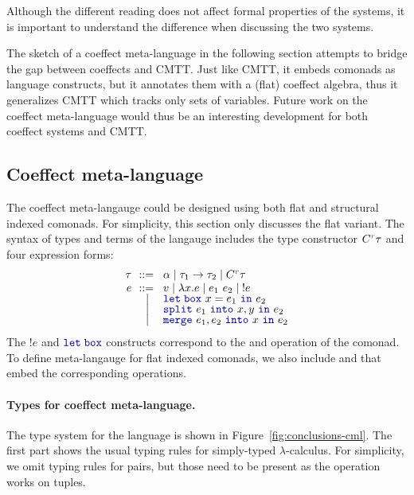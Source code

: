 \noindent
Although the different reading does not affect formal properties of the systems, it is important
to understand the difference when discussing the two systems. 

The sketch of a coeffect meta-language in the following section attempts to bridge the gap
between coeffects and CMTT. Just like CMTT, it embeds comonads as language constructs, but
it annotates them with a (flat) coeffect algebra, thus it generalizes CMTT which tracks only
sets of variables. Future work on the coeffect meta-language would thus be an interesting 
development for both coeffect systems and CMTT.


\subsection{Coeffect meta-language}

The coeffect meta-langauge could be designed using both flat and structural indexed comonads.
For simplicity, this section only discusses the flat variant. The syntax of types and terms
of the langauge includes the type constructor $\ctyp{\cclrd{r}}{\tau}$ and four expression forms:
%
\begin{equation*}
\begin{array}{rcl}
 \tau &\narrow{::=}& \alpha \sep \tau_1 \rightarrow \tau_2 \sep \ctyp{\cclrd{r}}{\tau}\\
 e &\narrow{::=}& v \sep \lambda x.e \sep e_1~e_2 \sep !e    \\[-0.25em]
  &        \sep& \kvd{let\;box}~x=e_1~\kvd{in}~e_2           \\[-0.25em]
  &        \sep& \kvd{split}~e_1~\kvd{into}~x,y~\kvd{in}~e_2 \\[-0.25em]
  &        \sep& \kvd{merge}~e_1, e_2~\kvd{into}~x~\kvd{in}~e_2 
\end{array}
\end{equation*}
%
The $!e$ and $\kvd{let\;box}$ constructs correspond to the  and 
operation of the comonad. To define meta-langauge for flat indexed comonads, we also include 
 and  that embed the corresponding operations. 

\paragraph{Types for coeffect meta-language.}
The type system for the language is shown in Figure~\ref{fig:conclusions-cml}. The first part
shows the usual typing rules for simply-typed $\lambda$-calculus. For simplicity, we omit typing 
rules for pairs, but those need to be present as the  operation works on tuples.

